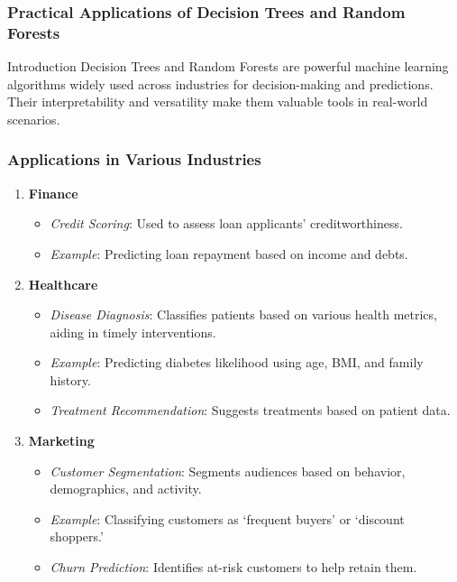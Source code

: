 \documentclass[aspectratio=169]{beamer}
\begin{document}
\begin{frame}[fragile]
    \frametitle{Practical Applications of Decision Trees and Random Forests}

    \begin{block}{Introduction}
        Decision Trees and Random Forests are powerful machine learning algorithms widely used across industries for decision-making and predictions. Their interpretability and versatility make them valuable tools in real-world scenarios.
    \end{block}
\end{frame}

\begin{frame}[fragile]
    \frametitle{Applications in Various Industries}

    \begin{enumerate}
        \item \textbf{Finance}
            \begin{itemize}
                \item \textit{Credit Scoring}: Used to assess loan applicants' creditworthiness.
                \item \textit{Example}: Predicting loan repayment based on income and debts.
            \end{itemize}

        \item \textbf{Healthcare}
            \begin{itemize}
                \item \textit{Disease Diagnosis}: Classifies patients based on various health metrics, aiding in timely interventions.
                \item \textit{Example}: Predicting diabetes likelihood using age, BMI, and family history.
                \item \textit{Treatment Recommendation}: Suggests treatments based on patient data.
            \end{itemize}

        \item \textbf{Marketing}
            \begin{itemize}
                \item \textit{Customer Segmentation}: Segments audiences based on behavior, demographics, and activity.
                \item \textit{Example}: Classifying customers as ‘frequent buyers’ or ‘discount shoppers.’
                \item \textit{Churn Prediction}: Identifies at-risk customers to help retain them.
            \end{itemize}
    \end{enumerate}
\end{frame}
\end{document}

